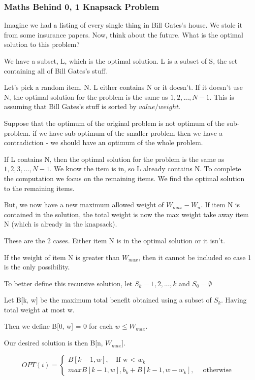 \documentclass{article}
\begin{document}
\subsubsection{Maths Behind {0, 1} Knapsack Problem}
Imagine we had a listing of every single thing in Bill Gates's house. We stole it from some insurance papers. Now, think about the future. What is the optimal solution to this problem?

We have a subset, L, which is the optimal solution. L is a subset of S, the set containing all of Bill Gates's stuff.

Let's pick a random item, N. L either contains N or it doesn't. If it doesn't use N, the optimal solution for the problem is the same as ${1, 2, ..., N-1}$. This is assuming that Bill Gates's stuff is sorted by $value / weight$.

Suppose that the optimum of the original problem is not optimum of the sub-problem. if we have sub-optimum of the smaller problem then we have a contradiction - we should have an optimum of the whole problem.

If L contains N, then the optimal solution for the problem is the same as ${1, 2, 3, ..., N-1}$. We know the item is in, so L already contains N. To complete the computation we focus on the remaining items. We find the optimal solution to the remaining items.

But, we now have a new maximum allowed weight of $W_{max} - W_n$. If item N is contained in the solution, the total weight is now the max weight take away item N (which is already in the knapsack).

These are the 2 cases. Either item N is in the optimal solution or it isn't.

If the weight of item N is greater than $W_{max}$, then it cannot be included so case 1 is the only possibility.

To better define this recursive solution, let $S_k = {1, 2, ..., k}$ and $S_0 = \emptyset$

Let B[k, w] be the maximum total benefit obtained using a subset of $S_k$. Having total weight at most w.

Then we define B[0, w] = 0 for each $w \le W_{max}$.

Our desired solution is then B[n, $W_{max}$].

$$  OPT(i) = \begin{cases} B[k - 1, w], \quad \text{If w < }w_k \\ max{B[k-1, w], b_k + B[k - 1, w - w_k]}, \; \quad \text{otherwise} \end{cases}$$
\end{document}
